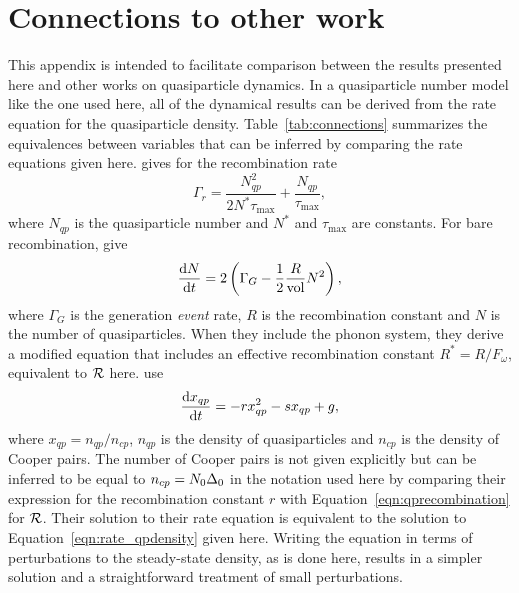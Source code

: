 \chapter{Connections to other work}
\label{chp:connections}

This appendix is intended to facilitate comparison between the results presented here and other works on quasiparticle dynamics.
In a quasiparticle number model like the one used here, all of the dynamical results can be derived from the rate equation for the quasiparticle density.
Table~\ref{tab:connections} summarizes the equivalences between variables that can be inferred by comparing the rate equations given here.
\textcite{Zmuidzinas2012ARCMP} gives for the recombination rate
\begin{equation}
\Gamma_r
  =
  \frac{N_{qp}^2}{2 N^* \tau_\mathrm{max}}
  + \frac{N_{qp}}{\tau_\mathrm{max}},
\end{equation}
where $N_{qp}$ is the quasiparticle number and $N^*$ and $\tau_\mathrm{max}$ are constants.
For bare recombination, \textcite{Wilson2004PRB} give
\begin{equation}
\dv{N}{t}
  =
  2 \left( \Gamma_G - \frac{1}{2} \frac{R}{\mathrm{vol}} N^2 \right),
\end{equation}
where $\Gamma_G$ is the generation \textit{event} rate, $R$ is the recombination constant and $N$ is the number of quasiparticles.
When they include the phonon system, they derive a modified equation that includes an effective recombination constant
$R^* = R / F_\omega$, equivalent to $\mathcal{R}$ here.
\textcite{Wang2014NatComm} use
\begin{equation}
\dv{x_{qp}}{t}
 =
 -r x_{qp}^2 - s x_{qp} + g,
\end{equation}
where $x_{qp} = n_{qp} / n_{cp}$, $n_{qp}$ is the density of quasiparticles and $n_{cp}$ is the density of Cooper pairs.
The number of Cooper pairs is not given explicitly but can be inferred to be equal to
$n_{cp} = N_0 \Delta_0$ in the notation used here
by comparing their expression for the recombination constant $r$ with Equation~\ref{eqn:qprecombination} for $\mathcal{R}$.
Their solution to their rate equation is equivalent to the solution to Equation~\ref{eqn:rate_qpdensity} given here.
Writing the equation in terms of perturbations to the steady-state density, as is done here, results in a simpler solution and a straightforward treatment of small perturbations.

